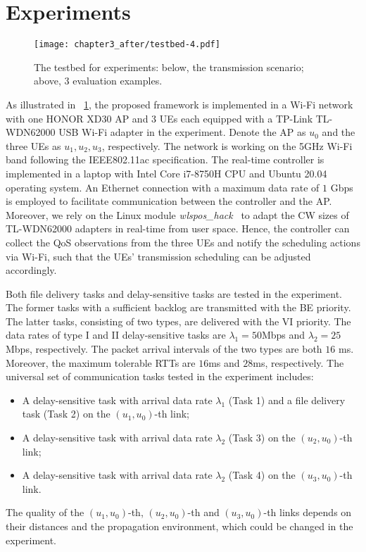 \section{Experiments}
\label{sec:chapter3_after-testbed}

\begin{figure}[!t]
    \centering
    \texttt{[image: chapter3\_after/testbed-4.pdf]}
    \caption{The testbed for experiments: below, the transmission scenario; above, $3$ evaluation examples.}
    \label{fig:Testbed Setup}
\end{figure}

As illustrated in \figurename~\ref{fig:Testbed Setup}, the proposed {\algName} framework is implemented in a Wi-Fi network with one HONOR XD30 AP and $3$ UEs each equipped with a TP-Link TL-WDN62000 USB Wi-Fi adapter in the experiment. 
Denote the AP as $u_0$ and the three UEs as $u_1, u_2, u_3$, respectively. 
The network is working on the 5GHz Wi-Fi band following the IEEE802.11ac specification.
The real-time controller is implemented in a laptop with Intel Core i7-8750H CPU and Ubuntu 20.04 operating system. %
An Ethernet connection with a maximum data rate of $1$ Gbps is employed to facilitate communication between the controller and the AP.\@ 
Moreover, we rely on the Linux module \textit{wlspos\_hack}~\cite{lasso-sustech_wlsops-hack_2023} to adapt the CW sizes of TL-WDN62000 adapters in real-time from user space. 
Hence, the controller can collect the QoS observations from the three UEs and notify the scheduling actions via Wi-Fi, such that the UEs' transmission scheduling can be adjusted accordingly.

Both file delivery tasks and delay-sensitive tasks are tested in the experiment. The former tasks with a sufficient backlog are transmitted with the BE priority. The latter tasks, consisting of two types, are delivered with the VI priority. The data rates of type I and II delay-sensitive tasks are $\lambda_1 = 50$Mbps and $\lambda_2 = 25$Mbps, respectively. The packet arrival intervals of the two types are both  $16$ ms. Moreover, the maximum tolerable RTTs are $16$ms and $28$ms, respectively. The universal set of communication tasks tested in the experiment includes:
\begin{itemize}
    \item A delay-sensitive task with arrival data rate $\lambda_1$ (Task 1) and a file delivery task (Task 2) on the $(u_1,u_0)$-th link;
    \item A delay-sensitive task with arrival data rate $\lambda_2$ (Task 3) on the $(u_2,u_0)$-th link;
    \item A delay-sensitive task with arrival data rate $\lambda_2$ (Task 4) on the $(u_3,u_0)$-th link.
\end{itemize}
The quality of the $(u_1,u_0)$-th, $(u_2,u_0)$-th and $(u_3,u_0)$-th links depends on their distances and the propagation environment, which could be changed in the experiment. 

